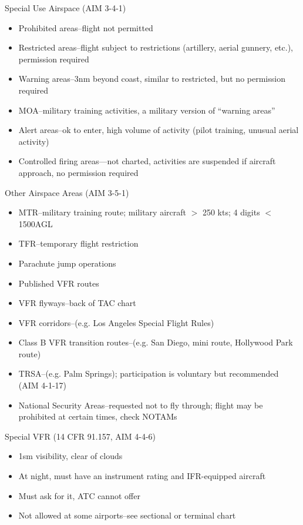 Special Use Airspace (AIM 3-4-1)
\begin{itemize}
  \item Prohibited areas--flight not permitted
  \item Restricted areas--flight subject to restrictions (artillery, aerial
    gunnery, etc.), permission required
  \item Warning areas--3nm beyond coast, similar to restricted, but no
    permission required
  \item MOA--military training activities, a military version of ``warning
    areas''
  \item Alert areas--ok to enter, high volume of activity (pilot training,
    unusual aerial activity)
  \item Controlled firing areas—not charted, activities are suspended if
    aircraft approach, no permission required
\end{itemize}

Other Airspace Areas (AIM 3-5-1)
\begin{itemize}
  \item MTR--military training route; military aircraft $>$ 250 kts; 4 digits $<$
    1500AGL
  \item TFR--temporary flight restriction
  \item Parachute jump operations
  \item Published VFR routes
  \item VFR flyways--back of TAC chart
  \item VFR corridors--(e.g. Los Angeles Special Flight Rules)
  \item Class B VFR transition routes--(e.g. San Diego, mini route, Hollywood
    Park route)
  \item TRSA--(e.g. Palm Springs); participation is voluntary but recommended
    (AIM 4-1-17)
  \item National Security Areas--requested not to fly through; flight may be
    prohibited at certain times, check NOTAMs
\end{itemize}

Special VFR (14 CFR 91.157, AIM 4-4-6)
\begin{itemize}
  \item 1sm visibility, clear of clouds
  \item At night, must have an instrument rating and IFR-equipped aircraft
  \item Must ask for it, ATC cannot offer
  \item Not allowed at some airports--see sectional or terminal chart
\end{itemize}

